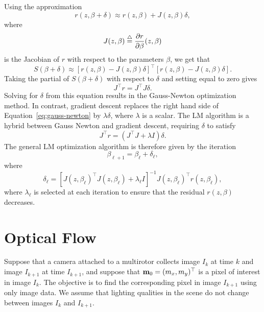 Using the approximation 
\[
r(z, \beta+\delta) \approx r(z, \beta) + J(z, \beta)\delta,
\]
where 
\[
J(z, \beta) \stackrel{\triangle}{=} \frac{\partial r}{\partial \beta} (z, \beta)
\]
is the Jacobian of $r$ with respect to the parameters $\beta$, we get that
\[
S(\beta+\delta) \approx [r(z, \beta) - J(z, \beta)\delta]^\top [r(z, \beta)- J(z, \beta)\delta].
\]
Taking the partial of $S(\beta+\delta)$ with respect to $\delta$ and setting equal to zero gives
\begin{equation}\label{eq:gauss-newton}
J^\top r = J^\top J \delta.
\end{equation}
Solving for $\delta$ from this equation results in the Gauss-Newton optimization method.  In contrast, gradient descent replaces the right hand side of Equation~\eqref{eq:gauss-newton} by $\lambda\delta$, where $\lambda$ is a scalar. The LM algorithm is a hybrid between Gauss Newton and gradient descent, requiring $\delta$ to satisfy
\begin{equation}\label{eq:LM_lambda}
J^\top r = (J^\top J + \lambda I) \delta.
\end{equation}
The general LM optimization algorithm is therefore given by the iteration
\begin{equation}\label{eq:general_lm_alg}
\beta_{\ell+1} = \beta_\ell + \delta_\ell,
\end{equation}
where
\[
\delta_\ell = \left[J(z,\beta_\ell)^\top J(z,\beta_\ell) + \lambda_\ell I\right]^{-1} J(z,\beta_\ell)^\top r(z, \beta_\ell),
\]
where $\lambda_\ell$ is selected at each iteration to ensure that the residual $r(z, \beta)$ decreases.

\section{Optical Flow}
\label{sec:optical_flow}

Suppose that a camera attached to a multirotor collects image $I_k$ at time $k$ and image $I_{k+1}$ at time $I_{k+1}$, and suppose that $\mathbf{m}_0 = (m_x, m_y)^\top$ is a pixel of interest in image $I_k$.  The objective is to find the corresponding pixel in image $I_{k+1}$ using only image data.  We assume that lighting qualities in the scene do not change between images $I_k$ and $I_{k+1}$.  

